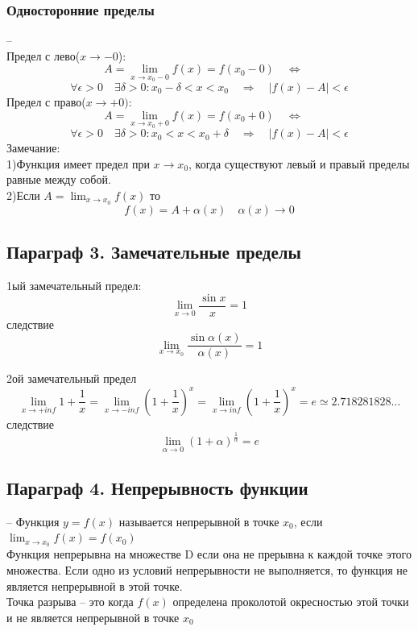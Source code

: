 \documentclass[a4paper, 12pt]{article}
\begin{document}
\subsubsection*{Односторонние пределы}
--\\
Предел с лево($ x \to -0$): 
\[
  A = \lim_{x\to x_0 - 0} f(x) = f(x_0-0) \quad \Leftrightarrow \quad 
\]
\[
  \forall \epsilon > 0 \quad \exists \delta > 0:x_0 - \delta < x < x_0 \quad \Rightarrow \quad |f(x) - A| < \epsilon
\]
Предел с право($ x \to +0) $:
\[
  A = \lim_{x\to x_0 + 0} f(x) = f(x_0+0) \quad \Leftrightarrow \quad 
\]
\[
  \forall \epsilon > 0 \quad \exists \delta > 0:x_0  < x < x_0 + \delta \quad \Rightarrow \quad |f(x) - A| < \epsilon
\]
Замечание:\\ 
1)Функция имеет предел при $ x \to x_0 $, когда существуют левый и правый пределы равные между собой.\\
2)Если $ A = \lim_{x\to x_0} f(x) $ то \[
  f(x) = A + \alpha(x) \quad \alpha(x)\to 0
\]

\subsection{Параграф 3. Замечательные пределы}

1ый замечательный предел:
\[
  \lim_{x\to 0}  \frac{\sin x}{x} = 1
\]
следствие 
\[
  \lim_{x\to x_0} \frac{\sin \alpha(x)}{\alpha (x)} = 1 
\]

2ой замечательный предел
\[
  \lim_{x\to +inf} 1 + \frac{1}{x} = \lim_{x\to -inf}(1 + \frac{1}{x})^x=\lim_{x\to inf}(1 + \frac{1}{x})^x = e\simeq 2.718281828\ldots
\]
следствие \[
  \lim_{\alpha\to 0} (1 + \alpha)^\frac{1}{\alpha} = e 
\]

\subsection{Параграф 4. Непрерывность функции}
-- Функция $ y = f(x) $ называется непрерывной в точке $ x_0 $, если \\
$ \lim_{x\to x_0}f(x) = f(x_0)  $\\

Функция непрерывна на множестве D  если она не прерывна к каждой точке этого множества. 
Если одно из условий непрерывности не выполняется, то функция не является непрерывной в этой точке.\\

Точка разрыва -- это когда $f(x)$ определена проколотой окресностью этой точки и не является непрерывной в точке $ x_0 $\\
\end{document}
